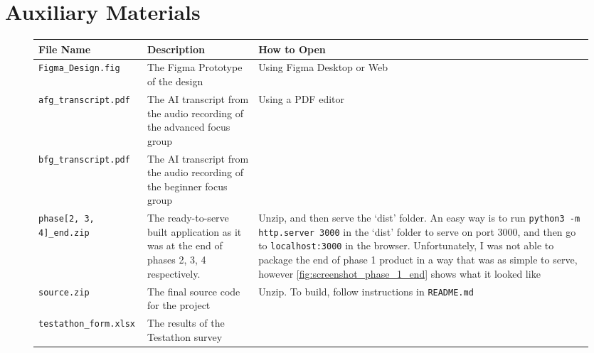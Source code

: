 \chapter{Auxiliary Materials}
\label{appx:additional_mats}
\begin{figure}[h]
    \centering
    \begin{tabular}{|m{4cm}|p{5cm}|>{\raggedright\arraybackslash}p{5.5cm}|}
        \hline\textbf{File Name} & \textbf{Description} & \textbf{How to Open} \\[1ex] \hline\vspace{1ex}
        \verb|Figma_Design.fig| & The Figma Prototype of the design & Using Figma Desktop or Web\\[1ex] \hline\vspace{1ex}
        \verb|afg_transcript.pdf| & The AI transcript from the audio recording of the advanced focus group & Using a PDF editor \\[1ex] \cline{1-2}\vspace{1ex}
        \verb|bfg_transcript.pdf| & The AI transcript from the audio recording of the beginner focus group & \ \\[1ex] \hline\vspace{1ex}

        \verb|phase[2, 3, 4]_end.zip| & The ready-to-serve built application as it was at the end of phases 2, 3, 4 respectively. & Unzip, and then serve the `dist' folder. An easy way is to run \verb|python3 -m http.server 3000| in the `dist' folder to serve on port 3000, and then go to \verb|localhost:3000| in the browser. Unfortunately, I was not able to package the end of phase 1 product in a way that was as simple to serve, however \ref{fig:screenshot_phase_1_end} shows what it looked like\\[1ex]\hline\vspace{1ex}

        \verb|source.zip| & The final source code for the project & Unzip. To build, follow instructions in \verb|README.md| \\[1ex] \hline\vspace{1ex}

        \verb|testathon_form.xlsx| & The results of the Testathon survey & \ \\ \hline
    \end{tabular}
\end{figure}
